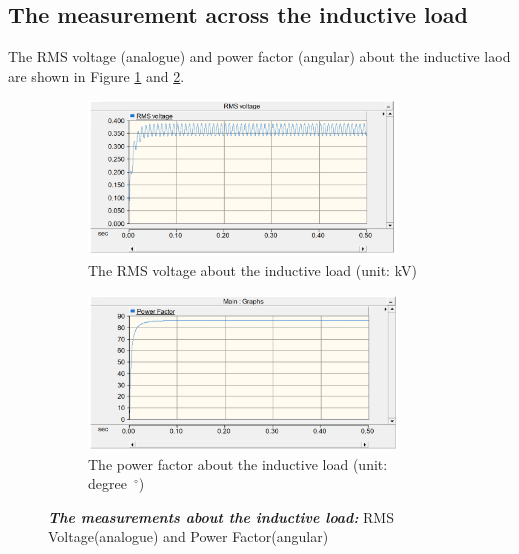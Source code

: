 \documentclass[12pt]{report} %
\begin{document}
\subsection{The measurement across the inductive load}
The RMS voltage (analogue) and power factor (angular) about the inductive laod are shown in Figure \ref{fig:Q2L_RMS} and \ref{fig:Q2L_PF}. 
\begin{figure}[H]
    \centering %
    \begin{subfigure}[b]{\textwidth}
        \centering
        \includegraphics[width=0.9\textwidth]{Image/Q2/Q2_inductor_RMS.PNG}
        \caption{The RMS voltage about the inductive load (unit: kV)}
        \label{fig:Q2L_RMS}
    \end{subfigure}
    \hfill
    \centering %
    \begin{subfigure}[b]{\textwidth}
        \centering
        \includegraphics[width=0.9\textwidth]{Image/Q2/Q2_inductor_PF.PNG}
        \caption{The power factor about the inductive load (unit: degree~$^\circ$)}
        \label{fig:Q2L_PF}
    \end{subfigure} 
    \caption[The RMS voltage and power factor about the inductive load ]
    {\centering \textit{\textbf{The measurements about the inductive load:}} RMS Voltage(analogue) and Power Factor(angular)}
    \label{fig:Q2L}
\end{figure}
\newpage
\end{document}
